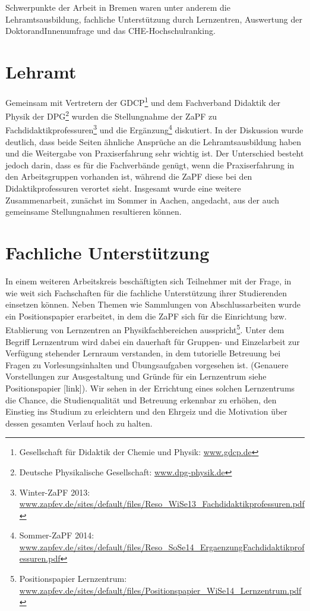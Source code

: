 \documentclass{scrartcl}
\renewcommand{\headrulewidth}{0pt}
\begin{document}
Schwerpunkte der Arbeit in Bremen waren unter anderem die Lehramtsausbildung, fachliche Unterst\"utzung durch Lernzentren, Auswertung der DoktorandInnenumfrage und das CHE-Hochschulranking.

\pagebreak
\renewcommand{\headrulewidth}{0.1pt}
\rhead{\thepage}

\section*{Lehramt}
Gemeinsam mit Vertretern der GDCP\footnote{Gesellschaft f\"ur Didaktik der Chemie und Physik: \href{http://www.gdcp.de}{\url{www.gdcp.de}}} und dem Fachverband Didaktik der Physik der DPG\footnote{Deutsche Physikalische Gesellschaft: \href{http://www.dpg-physik.de}{\url{www.dpg-physik.de}}} wurden die Stellungnahme der ZaPF zu Fachdidaktikprofessuren\footnote{Winter-ZaPF 2013: \href{http://zapfev.de/sites/default/files/Reso_WiSe13_Fachdidaktikprofessuren.pdf}{\url{www.zapfev.de/sites/default/files/Reso_WiSe13_Fachdidaktikprofessuren.pdf}}} und die Ergänzung\footnote{Sommer-ZaPF 2014: \href{http://zapfev.de/sites/default/files/Reso_SoSe14_ErgaenzungFachdidaktikprofessuren.pdf}{\url{www.zapfev.de/sites/default/files/Reso_SoSe14_ErgaenzungFachdidaktikprofessuren.pdf}}} diskutiert. In der Diskussion wurde deutlich, dass beide Seiten ähnliche Ansprüche an die Lehramtsausbildung haben und die Weitergabe von Praxiserfahrung sehr wichtig ist. Der Unterschied besteht jedoch darin, dass es für die Fachverbände genügt, wenn die Praxiserfahrung in den Arbeitsgruppen vorhanden ist, während die ZaPF diese bei den Didaktikprofessuren verortet sieht. Insgesamt wurde eine weitere Zusammenarbeit, zunächst im Sommer in Aachen, angedacht, aus der auch gemeinsame Stellungnahmen resultieren können.

\section*{Fachliche Unterstützung}
In einem weiteren Arbeitskreis beschäftigten sich Teilnehmer mit der Frage, in wie weit sich Fachschaften für die fachliche Unterstützung ihrer Studierenden einsetzen können. 
Neben Themen wie Sammlungen von Abschlussarbeiten wurde ein Positionspapier erarbeitet, in dem die ZaPF sich für die Einrichtung bzw. Etablierung von Lernzentren an Physikfachbereichen ausspricht\footnote{Positionspapier Lernzentrum: \href{www.zapfev.de/sites/default/files/Positionspapier_WiSe14_Lernzentrum.pdf}{\url{www.zapfev.de/sites/default/files/Positionspapier_WiSe14_Lernzentrum.pdf}}}. Unter dem Begriff Lernzentrum wird dabei ein dauerhaft für Gruppen- und Einzelarbeit zur Verfügung stehender Lernraum verstanden, in dem tutorielle Betreuung bei Fragen zu Vorlesungsinhalten und Übungsaufgaben vorgesehen ist. (Genauere Vorstellungen zur Ausgestaltung und Gründe für ein Lernzentrum siehe Positionspapier [link]). Wir sehen in der Errichtung eines solchen Lernzentrums die Chance, die Studienqualität und Betreuung erkennbar zu erhöhen, den Einstieg ins Studium zu erleichtern und den Ehrgeiz und die Motivation über dessen gesamten Verlauf hoch zu halten.
\end{document}
